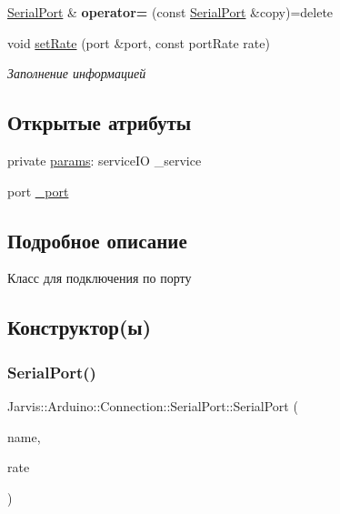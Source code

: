 \begin{DoxyCompactItemize}
\hyperlink{classJarvis_1_1Arduino_1_1Connection_1_1SerialPort}{Serial\+Port} \& {\bfseries operator=} (const \hyperlink{classJarvis_1_1Arduino_1_1Connection_1_1SerialPort}{Serial\+Port} \&copy)=delete
\item 
void \hyperlink{classJarvis_1_1Arduino_1_1Connection_1_1SerialPort_a312c671ec469d889c07a283ef27568d9}{set\+Rate} (port \&port, const port\+Rate rate)
\begin{DoxyCompactList}\small\item\em Заполнение информацией \end{DoxyCompactList}\end{DoxyCompactItemize}
\subsection*{Открытые атрибуты}
\begin{DoxyCompactItemize}
\item 
private \hyperlink{classJarvis_1_1Arduino_1_1Connection_1_1SerialPort_ae94ab8cb0505cd48431c8a013eeb9c26}{params}\+: service\+IO \+\_\+service
\item 
port \hyperlink{classJarvis_1_1Arduino_1_1Connection_1_1SerialPort_a5149372d91ed61041ad34219e1d6a49a}{\+\_\+port}
\end{DoxyCompactItemize}


\subsection{Подробное описание}
Класс для подключения по порту 

\subsection{Конструктор(ы)}
\mbox{\label{classJarvis_1_1Arduino_1_1Connection_1_1SerialPort_a9f327eb95493fa85c7db715b21ede8d0}} 
\subsubsection{\texorpdfstring{Serial\+Port()}{SerialPort()}}
{\footnotesize\ttfamily Jarvis\+::\+Arduino\+::\+Connection\+::\+Serial\+Port\+::\+Serial\+Port (\begin{DoxyParamCaption}\item[{const port\+Name \&}]{name,  }\item[{const port\+Rate}]{rate }\end{DoxyParamCaption})}



